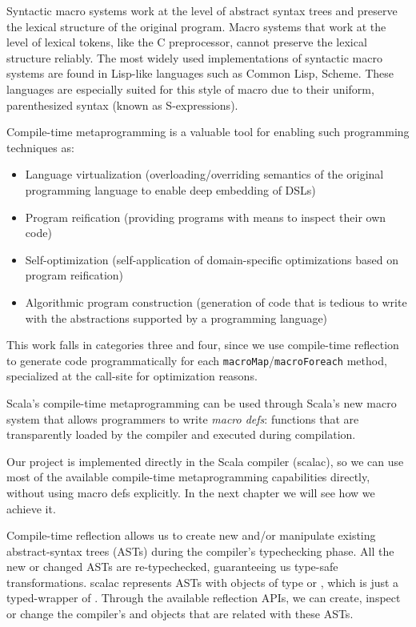 Syntactic macro systems work at the level of abstract syntax trees and preserve
the lexical structure of the original program. Macro systems that work at the
level of lexical tokens, like the C preprocessor, cannot preserve the
lexical structure reliably. The most widely used implementations of syntactic
macro systems are found in Lisp-like languages such as Common Lisp, Scheme. 
These languages are especially suited for this style of macro due to their uniform,
parenthesized syntax (known as S-expressions).

Compile-time metaprogramming is a valuable tool for enabling such programming
techniques as:

\begin{itemize}
  \item
    Language virtualization (overloading/overriding semantics of the original
    programming language to enable deep embedding of DSLs)
  \item
    Program reification (providing programs with means to inspect their own code)
  \item
     Self-optimization (self-application of domain-specific optimizations based on
program reification)
  \item
    Algorithmic program construction (generation of code that is tedious to write
    with the abstractions supported by a programming language)
\end{itemize}

This work falls in categories three and four, since we use compile-time
reflection to generate code programmatically for each \texttt{macroMap}/\texttt{macroForeach}
method, specialized at the call-site for optimization reasons.

Scala's compile-time metaprogramming can be used through Scala's new macro
system that allows programmers to write \emph{macro defs}: functions that are
transparently loaded by the compiler and executed during compilation.

Our project is implemented directly in the Scala compiler (scalac), so we can
use most of the available compile-time metaprogramming capabilities directly,
without using macro defs explicitly. In the next chapter we will see how we
achieve it.

Compile-time reflection allows us to create new and/or manipulate
existing abstract-syntax trees (ASTs)  during the compiler's typechecking phase.
All the new or changed ASTs are re-typechecked, guaranteeing us type-safe
transformations. scalac represents ASTs with objects of type
 or , which is just a typed-wrapper
of . Through the available reflection APIs, we can create,
inspect or change the compiler's  and
 objects that are related with these ASTs.

